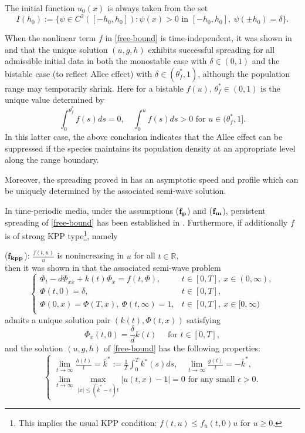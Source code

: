 \documentclass[11pt]{amsart}
\numberwithin{equation}{section}
\begin{document}
  The initial function $u_0(x)$ is always taken from the set 
 \begin{equation*}
  I(h_0):=\{\psi\in C^2([-h_0,h_0]):\psi(x)>0\text{ in }[-h_0,h_0], \ \psi(\pm h_0)=\delta\}.
 \end{equation*}

 When the nonlinear term $f$ in \eqref{free-bound} is time-independent, it was shown in \cite{D} and \cite{DLNN} that the unique solution $(u,g,h)$ exhibits successful spreading for all admissible initial data in both the monostable case with $\delta \in (0,1)$ and the bistable case (to reflect Allee effect) with $\delta \in (\theta_f^*,1)$, although the population range may temporarily shrink. Here for a bistable $f(u)$, $\theta_f^* \in (0,1)$ is the unique value determined by
\[\int_0^{\theta_f^*}f(s)ds=0,\quad \int_0^uf(s)ds>0 \text{ for }u\in(\theta_f^*,1].\]
In this latter case, the above conclusion indicates that the Allee effect can be suppressed if the species maintains its population density at an appropriate level along the range boundary.  

Moreover, the spreading proved in \cite{D,DLNN} has an asymptotic  speed and profile which can be  uniquely determined by the associated semi-wave solution.


In time-periodic media, under the assumptions ($\rm{\bf{f_p}}$) and  ($\rm{\bf{f_m}}$),    persistent spreading of  \eqref{free-bound} has been established in \cite{MDW}.  Furthermore, if additionally $f$ is of strong KPP type\footnote{This implies the usual KPP condition: $f(t,u)\leq f_u(t,0)u$ for $u\geq 0$.}, namely
\smallskip

  (${\bf{f_{kpp}}}$): $\frac{f(t,u)}{u}$ is nonincreasing in $u$ for all $t\in\mathbb R$,\smallskip
  \\
 then it was shown in \cite{MDW}  that  the associated semi-wave problem 
\begin{equation}\label{eqn-wave}
   \begin{cases}
     \Phi_t-d\Phi_{xx}+k(t)\Phi_x=f(t,\Phi),&t\in[0,T],~x\in(0,\infty),\\
\Phi(t,0)=\delta,&t\in[0,T],\\
\Phi(0,x)=\Phi(T,x), ~\Phi(t,\infty)=1, &t\in[0,T],~x\in[0,\infty)\\
   \end{cases}
  \end{equation}
admits a unique solution pair $(k(t), \Phi(t,x))$ satisfying 
  \begin{equation}\label{eq-phix1}
    \Phi_x(t,0)=\frac{\delta}{d}k(t)\quad  \text{ for }t\in[0,T],
  \end{equation}
  and the solution $(u,g,h)$ of \eqref{free-bound} has the following properties:
 \begin{equation*}
  \begin{cases}
   \lim_{t\to\infty}\frac{h(t)}{t}=\bar k^*:=\frac{1}{T}\int_{0}^{T}k^*(s)ds,\quad \lim_{t\to\infty}\frac{g(t)}{t}=-\bar k^*,\\
  \lim_{t\to\infty}\max_{|x|\leq (\bar{k}^*-\epsilon)t}|u(t,x)-1|=0 \text{ for any small }\epsilon>0.
  \end{cases}
\end{equation*}
\end{document}
